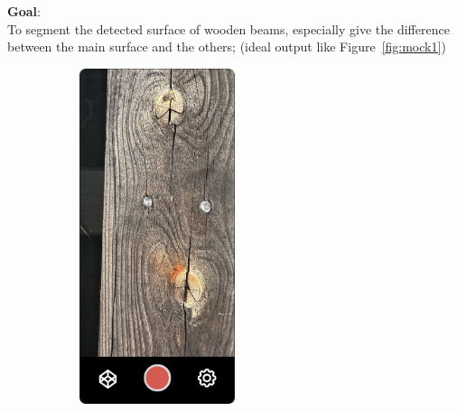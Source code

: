 \renewcommand\thesection{\arabic{section}}
\renewcommand\thesubsection{\thesection.\arabic{subsection}}


\textbf{Goal}:\\
To segment the detected surface of wooden beams, especially give the difference between the main surface and the others; (ideal output like Figure~\ref{fig:mock1})

\hspace*{\fill}


\begin{figure}[ht]
  \centering
    \begin{subfigure}[b]{0.4\textwidth}
      \centering
        \includegraphics[width=0.5\textwidth]{Master Thesis/Images/Section_3/Mock/3-Mock1.png}
    \end{subfigure}
    \begin{subfigure}[b]{0.4\textwidth}
      \centering

\end{subfigure}
\end{figure}
